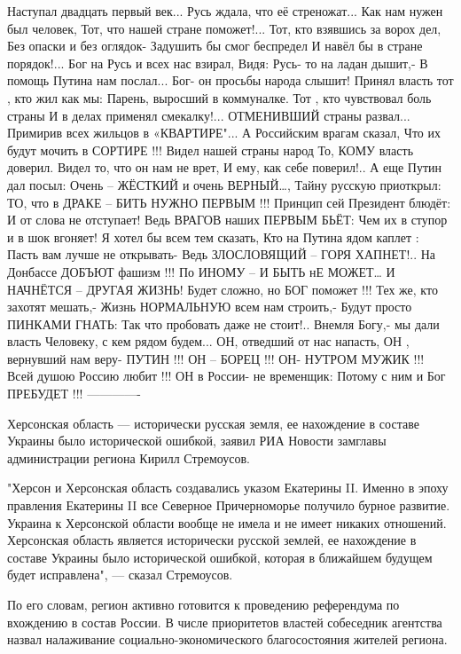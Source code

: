 Наступал двадцать первый век...
Русь ждала, что её стреножат...
Как нам нужен был человек,
Тот, что нашей стране поможет!...
Тот, кто взявшись за ворох дел,
Без опаски и без оглядок-
Задушить бы смог беспредел
И навёл бы в стране порядок!...
Бог на Русь и всех нас взирал,
Видя: Русь- то на ладан дышит,-
В помощь Путина нам послал...
Бог- он просьбы народа слышит!
Принял власть тот , кто жил как мы:
Парень, выросший в коммуналке.
Тот , кто чувствовал боль страны
И в делах применял смекалку!...
ОТМЕНИВШИЙ страны развал...
Примирив всех жильцов в «КВАРТИРЕ"...
А Российским врагам сказал,
Что их будут мочить в СОРТИРЕ !!!
Видел нашей страны народ
То, КОМУ власть доверил.
Видел то, что он нам не врет,
И ему, как себе поверил!..
А еще Путин дал посыл:
Очень – ЖЁСТКИЙ и очень ВЕРНЫЙ…,
Тайну русскую приоткрыл:
ТО, что в ДРАКЕ – БИТЬ НУЖНО ПЕРВЫМ !!!
Принцип сей Президент блюдёт:
И от слова не отступает!
Ведь ВРАГОВ наших ПЕРВЫМ БЬЁТ:
Чем их в ступор и в шок вгоняет!
Я хотел бы всем тем сказать,
Кто на Путина ядом каплет :
Пасть вам лучше не открывать-
Ведь ЗЛОСЛОВЯЩИЙ – ГОРЯ ХАПНЕТ!..
На Донбассе ДОБЪЮТ фашизм !!!
По ИНОМУ – И БЫТЬ нЕ МОЖЕТ…
И НАЧНЁТСЯ – ДРУГАЯ ЖИЗНЬ!
Будет сложно, но БОГ поможет !!!
Тех же, кто захотят мешать,-
Жизнь НОРМАЛЬНУЮ всем нам строить,-
Будут просто ПИНКАМИ ГНАТЬ:
Так что пробовать даже не стоит!..
Внемля Богу,- мы дали власть
Человеку, с кем рядом будем...
ОН, отведший от нас напасть,
ОН , вернувший нам веру- ПУТИН !!!
ОН – БОРЕЦ !!! ОН- НУТРОМ МУЖИК !!!
Всей душою Россию любит !!!
ОН в России- не временщик:
Потому с ним и Бог ПРЕБУДЕТ !!!
-------------

Херсонская область — исторически русская земля, ее нахождение в составе
Украины было исторической ошибкой, заявил РИА Новости замглавы администрации
региона Кирилл Стремоусов.

"Херсон и Херсонская область создавались указом Екатерины II. Именно в эпоху
правления Екатерины II все Северное Причерноморье получило бурное развитие.
Украина к Херсонской области вообще не имела и не имеет никаких отношений.
Херсонская область является исторически русской землей, ее нахождение в составе
Украины было исторической ошибкой, которая в ближайшем будущем будет
исправлена", — сказал Стремоусов.

По его словам, регион активно готовится к проведению референдума по вхождению в
состав России. В числе приоритетов властей собеседник агентства назвал
налаживание социально-экономического благосостояния жителей региона.

